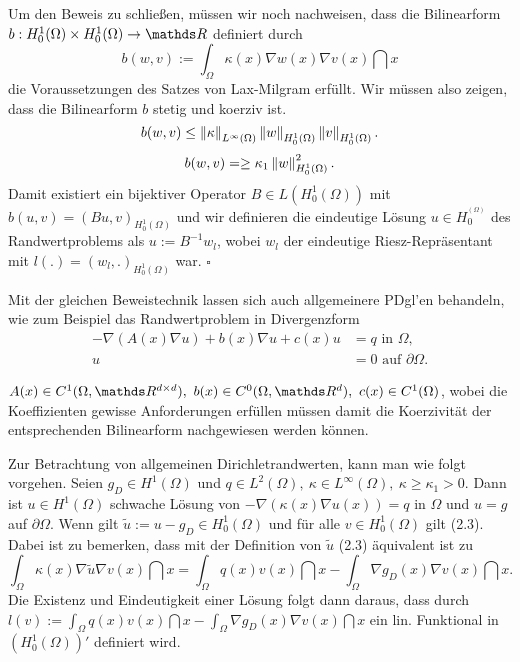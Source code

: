 Um den Beweis zu schließen, müssen wir noch nachweisen, dass die Bilinearform $b:H_0^1(\Omega)\times H_0^1(\Omega) \to \R$ definiert durch
\[
b(w,v) := \int_{\Omega} \kappa(x) \nabla w(x) \nabla v(x) \dint x
\]
die Voraussetzungen des Satzes von Lax-Milgram erfüllt.
Wir müssen also zeigen, dass die Bilinearform $b$ stetig und koerziv ist.\\
\[
b(w,v) \le \left\Vert\kappa\right\Vert_{L^\infty(\Omega)} \left\Vert w\right\Vert_{H_0^1(\Omega)} \left\Vert v\right\Vert_{H_0^1(\Omega)}.
\]
\[
b(w,v) = \ge \kappa_1 \left\Vert w\right\Vert_{H_0^1(\Omega)}^2.
\]
Damit existiert ein bijektiver Operator $B\in L(H_0^1(\Omega))$ mit $b(u,v)= (Bu,v)_{H_0^1(\Omega)}$ und wir definieren die eindeutige Lösung $u\in H_0^^(\Omega)$ des Randwertproblems als $u := B^{-1}w_l$, wobei $w_l$ der eindeutige Riesz-Repräsentant mit $l(.)= (w_l,.)_{H_0^1(\Omega)}$ war.
\hfill $\square$

Mit der gleichen Beweistechnik lassen sich auch allgemeinere PDgl'en behandeln, wie zum Beispiel das Randwertproblem in Divergenzform
\begin{align*}
-\nabla (A(x)\nabla u) +b(x)\nabla u + c(x) u &= q \text{ in } \Omega,\\
u &= 0 \text{ auf } \partial\Omega.
\end{align*}

$A(x) \in C^1(\Omega,\R^{d\times d}),~b(x)\in C^0(\Omega,\R^d),~c(x)\in C^1(\Omega)$, wobei die Koeffizienten gewisse Anforderungen erfüllen müssen damit die Koerzivität der entsprechenden Bilinearform nachgewiesen werden können.

Zur Betrachtung von allgemeinen Dirichletrandwerten, kann man wie folgt vorgehen.
Seien $g_D\in H^1(\Omega)$ und $q\in L^2(\Omega),~\kappa\in L^\infty(\Omega),~\kappa\ge \kappa_1 >0$. 
Dann ist $u\in H^1(\Omega)$ schwache Lösung von $-\nabla(\kappa(x)\nabla u(x)) = q$ in $\Omega$ und $u=g$ auf $\partial\Omega$.
Wenn gilt $\tilde{u}:= u-g_D \in H_0^1(\Omega)$ und für alle $v\in H_0^1(\Omega)$ gilt (2.3).
Dabei ist zu bemerken, dass mit der Definition von $\tilde{u}$ (2.3) äquivalent ist zu 
\[
\int_{\Omega} \kappa(x)\nabla \tilde{u} \nabla v(x)\dint x = \int_\Omega q(x) v(x)\dint x - \int_\Omega \nabla g_D(x) \nabla v(x) \dint x.
\]
Die Existenz und Eindeutigkeit einer Lösung folgt dann daraus, dass durch $l(v) := \int_\Omega q(x) v(x)\dint x - \int_\Omega \nabla g_D(x) \nabla v(x) \dint x$ ein lin. Funktional in $(H_0^1(\Omega))'$ definiert wird.

